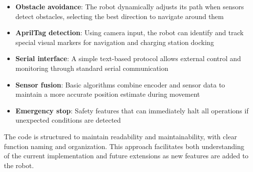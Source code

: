 \begin{itemize}
    \item \textbf{Obstacle avoidance}: The robot dynamically adjusts its path when sensors detect obstacles, selecting the best direction to navigate around them
    
    \item \textbf{AprilTag detection}: Using camera input, the robot can identify and track special visual markers for navigation and charging station docking
    
    \item \textbf{Serial interface}: A simple text-based protocol allows external control and monitoring through standard serial communication
    
    \item \textbf{Sensor fusion}: Basic algorithms combine encoder and sensor data to maintain a more accurate position estimate during movement
    
    \item \textbf{Emergency stop}: Safety features that can immediately halt all operations if unexpected conditions are detected
\end{itemize}

The code is structured to maintain readability and maintainability, with clear function naming and organization. This approach facilitates both understanding of the current implementation and future extensions as new features are added to the robot.
